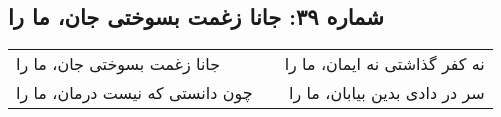 \begin{center}
\section*{شماره ۳۹: جانا زغمت بسوختی جان، ما را}
\label{sec:039}
\begin{longtable}{l p{0.5cm} r}
جانا زغمت بسوختی جان، ما را
&&
نه کفر گذاشتی نه ایمان، ما را
\\
چون دانستی که نیست درمان، ما را
&&
سر در دادی بدین بیابان، ما را
\\
\end{longtable}
\end{center}
